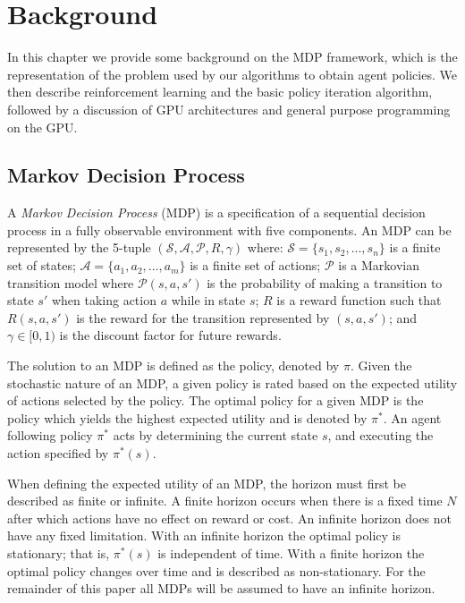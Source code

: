 \chapter{Background}
\label{chap:background}

In this chapter we provide some background on the MDP framework, which is the representation of the problem used by our algorithms to obtain agent policies. We then describe reinforcement learning and the basic policy iteration algorithm, followed by a discussion of GPU architectures and general purpose programming on the GPU.

\section{Markov Decision Process}

A \emph{Markov Decision Process} (MDP) \cite{norvig} is a specification of a sequential decision process in a fully observable environment with five components. An MDP can be represented by the 5-tuple $(\mathcal{S, A, P}, R, \gamma)$ where: $\mathcal{S} = \{s_1, s_2, ..., s_n\}$ is a finite set of states; $\mathcal{A} = \{a_1, a_2, ..., a_m\}$ is a finite set of actions; $\mathcal{P}$ is a Markovian transition model where $\mathcal{P}(s, a, s')$ is the probability of making a transition to state $s'$ when taking action $a$ while in state $s$; $R$ is a reward function such that $R(s, a, s')$ is the reward for the transition represented by $(s, a, s')$; and $\gamma \in [0, 1)$ is the discount factor for future rewards.

The solution to an MDP is defined as the policy, denoted by $\pi$. Given the stochastic nature of an MDP, a given policy is rated based on the expected utility of actions selected by the policy. The optimal policy for a given MDP is the policy which yields the highest expected utility and is denoted by $\pi^*$. An agent following policy $\pi^*$ acts by determining the current state $s$, and executing the action specified by $\pi^*(s)$.

When defining the expected utility of an MDP, the horizon must first be described as finite or infinite. A finite horizon occurs when there is a fixed time $N$ after which actions have no effect on reward or cost. An infinite horizon does not have any fixed limitation. With an infinite horizon the optimal policy is stationary; that is, $\pi^*(s)$ is independent of time. With a finite horizon the optimal policy changes over time and is described as non-stationary. For the remainder of this paper all MDPs will be assumed to have an infinite horizon.

